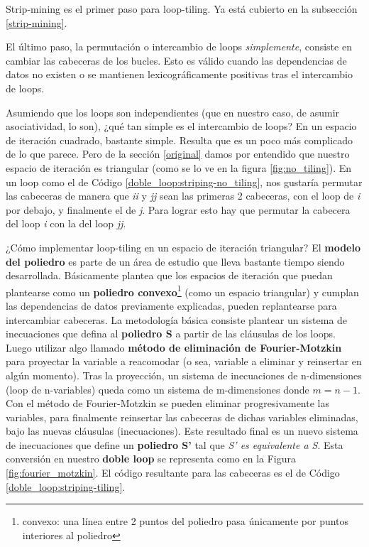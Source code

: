 \documentclass{article}
\begin{document}
Strip-mining es el primer paso para loop-tiling. Ya está cubierto en la subsección \ref{strip-mining}.


El último paso, la permutación o intercambio de loops \textit{simplemente}, consiste en cambiar las cabeceras de los bucles.
Esto es válido cuando las dependencias de datos no existen o se mantienen lexicográficamente positivas
tras el intercambio de loops.


Asumiendo que los loops son independientes (que en nuestro caso, de asumir asociatividad, lo son),
¿qué tan simple es el intercambio de loops? En un espacio de iteración cuadrado, bastante simple. Resulta
que es un poco más complicado de lo que parece. Pero de la sección \ref{original} damos por entendido que
nuestro espacio de iteración es triangular (como se lo ve en la figura \ref{fig:no_tiling}).
En un loop como el de Código \ref{doble_loop:striping-no_tiling}, nos gustaría permutar las cabeceras de manera que
\textit{ii} y \textit{jj} sean las primeras 2 cabeceras, con el loop de \textit{i} por debajo, y finalmente
el de \textit{j}. Para lograr esto hay que permutar la cabecera del loop \textit{i} con la del loop \textit{jj}.


¿Cómo implementar loop-tiling en un espacio de iteración triangular? El \textbf{modelo del poliedro} es parte
de un área de estudio que lleva bastante tiempo siendo desarrollada. Básicamente plantea que los espacios
de iteración que puedan plantearse como un \textbf{poliedro convexo}\footnote{convexo: una línea entre 2 puntos
del poliedro pasa únicamente por puntos interiores al poliedro} (como un espacio triangular) y cumplan las dependencias
de datos previamente explicadas, pueden replantearse para intercambiar cabeceras. La metodología básica consiste
plantear un sistema de inecuaciones que defina al \textbf{poliedro S} a partir de las cláusulas de los loops. Luego utilizar
algo llamado \textbf{método de eliminación de Fourier-Motzkin} para proyectar la variable a reacomodar (o sea, variable a eliminar y
reinsertar en algún momento). Tras la proyección, un sistema de inecuaciones de n-dimensiones (loop de n-variables)
queda como un sistema de m-dimensiones donde $m=n-1$. Con el método de Fourier-Motzkin se pueden eliminar progresivamente las variables,
para finalmente reinsertar las cabeceras de dichas variables eliminadas, bajo las nuevas cláusulas (inecuaciones). Este resultado
final es un nuevo sistema de inecuaciones que define un \textbf{poliedro S'} tal que \textit{S' es equivalente a S}.
Esta conversión en nuestro \textbf{doble loop} se representa como en la Figura \ref{fig:fourier_motzkin}. El código
resultante para las cabeceras es el de Código \ref{doble_loop:striping-tiling}.
\end{document}
